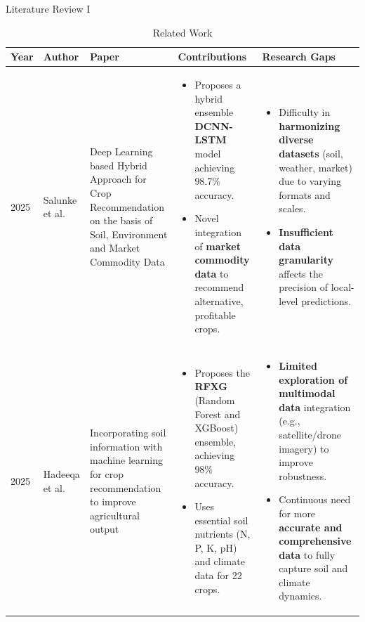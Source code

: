 \documentclass[aspectratio=169]{beamer}
\begin{document}
\begin{frame}{Literature Review I}
\begin{table}[ht]
    \centering
    \caption{Related Work}
    \tiny
    \begin{tabular}{|p{0.3in} | p{0.78in}| p{0.68in}| p{1.2in}|p{1.35in}|}
    \hline
    \textbf{Year} & \textbf{Author} &  \textbf{Paper} & \textbf{Contributions} & \textbf{Research Gaps} \\
    \hline
    \vspace{1mm}
  2025 & Salunke et al. \cite{salunke2025deep} & Deep Learning based Hybrid Approach for Crop Recommendation on the basis of Soil, Environment and Market Commodity Data & \begin{itemize}
    \item Proposes a hybrid ensemble \textbf{DCNN-LSTM} model achieving 98.7\% accuracy.
    \item Novel integration of \textbf{market commodity data} to recommend alternative, profitable crops.
\end{itemize}  & \begin{itemize}
    \item Difficulty in \textbf{harmonizing diverse datasets} (soil, weather, market) due to varying formats and scales.
    \item \textbf{Insufficient data granularity} affects the precision of local-level predictions.
\end{itemize}  \\
    \hline
    \vspace{1mm}
  2025 & Hadeeqa et al. \cite{hadeeqa2025incorporating} & Incorporating soil information with machine learning for crop recommendation to improve agricultural output &  \begin{itemize}
    \item Proposes the \textbf{RFXG} (Random Forest and XGBoost) ensemble, achieving 98\% accuracy.
    \item Uses essential soil nutrients (N, P, K, pH) and climate data for 22 crops.
\end{itemize} & \begin{itemize}
    \item \textbf{Limited exploration of multimodal data} integration (e.g., satellite/drone imagery) to improve robustness.
    \item Continuous need for more \textbf{accurate and comprehensive data} to fully capture soil and climate dynamics.
\end{itemize} \\
    \hline
    \end{tabular}
\end{table}
\end{frame}
\end{document}
